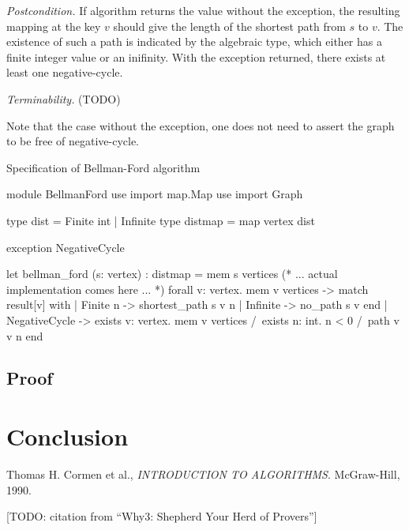 \documentclass[a4paper,12pt]{article}
\begin{document}
\emph{Postcondition.} If algorithm returns the value without the exception, the resulting mapping at the key $ v $ should give the length of the shortest path from $ s $ to $ v $. The existence of such a path is indicated by the algebraic type, which either has a finite integer value or an inifinity. With the exception returned, there exists at least one negative-cycle.

\emph{Terminability.} (TODO)

Note that the case without the exception, one does not need to assert the graph to be free of negative-cycle.








\begin{algorithm}
\caption{Specification of Bellman-Ford algorithm}\label{lst:why_bf}
\begin{why3}[1]
module BellmanFord
  use import map.Map
  use import Graph

  type dist = Finite int | Infinite
  type distmap = map vertex dist

  exception NegativeCycle

  let bellman_ford (s: vertex) : distmap =
    { mem s vertices }
    (* ... actual implementation comes here ... *)
    { forall v: vertex. mem v vertices ->
        match result[v] with
        | Finite n -> shortest_path s v n
        | Infinite -> no_path s v
        end }
    | NegativeCycle ->
    { exists v: vertex. mem v vertices /\
      exists n: int. n < 0 /\ path v v n  }
end
\end{why3}
\end{algorithm}




\subsection{Proof}

\section{Conclusion}



\begin{thebibliography}{9}

  Thomas H. Cormen et al.,
  \emph{INTRODUCTION TO ALGORITHMS}.
  McGraw-Hill,
  1990.


[TODO: citation from ``Why3: Shepherd Your Herd of Provers'']

\end{thebibliography}
\end{document}
